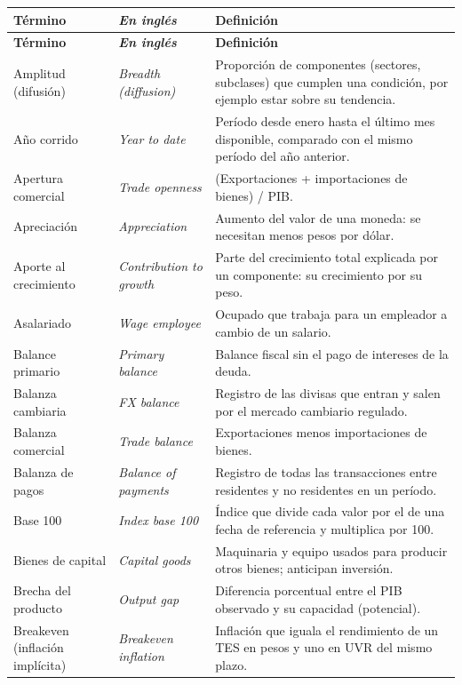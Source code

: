 \small
\begin{longtable}{>{\raggedright\arraybackslash}p{3.2cm}>{\raggedright\arraybackslash\itshape}p{3.2cm}>{\raggedright\arraybackslash}p{8.2cm}}
\toprule
\textbf{Término} & \textbf{\upshape En inglés} & \textbf{Definición}\\
\midrule
\endfirsthead
\toprule
\textbf{Término} & \textbf{\upshape En inglés} & \textbf{Definición}\\
\midrule
\endhead
\bottomrule
\endfoot
Amplitud (difusión) & Breadth (diffusion) & Proporción de componentes (sectores, subclases) que cumplen una condición, por ejemplo estar sobre su tendencia.\\
Año corrido & Year to date & Período desde enero hasta el último mes disponible, comparado con el mismo período del año anterior.\\
Apertura comercial & Trade openness & (Exportaciones + importaciones de bienes) / PIB.\\
Apreciación & Appreciation & Aumento del valor de una moneda: se necesitan menos pesos por dólar.\\
Aporte al crecimiento & Contribution to growth & Parte del crecimiento total explicada por un componente: su crecimiento por su peso.\\
Asalariado & Wage employee & Ocupado que trabaja para un empleador a cambio de un salario.\\
Balance primario & Primary balance & Balance fiscal sin el pago de intereses de la deuda.\\
Balanza cambiaria & FX balance & Registro de las divisas que entran y salen por el mercado cambiario regulado.\\
Balanza comercial & Trade balance & Exportaciones menos importaciones de bienes.\\
Balanza de pagos & Balance of payments & Registro de todas las transacciones entre residentes y no residentes en un período.\\
Base 100 & Index base 100 & Índice que divide cada valor por el de una fecha de referencia y multiplica por 100.\\
Bienes de capital & Capital goods & Maquinaria y equipo usados para producir otros bienes; anticipan inversión.\\
Brecha del producto & Output gap & Diferencia porcentual entre el PIB observado y su capacidad (potencial).\\
Breakeven (inflación implícita) & Breakeven inflation & Inflación que iguala el rendimiento de un TES en pesos y uno en UVR del mismo plazo.\\

\end{longtable}
